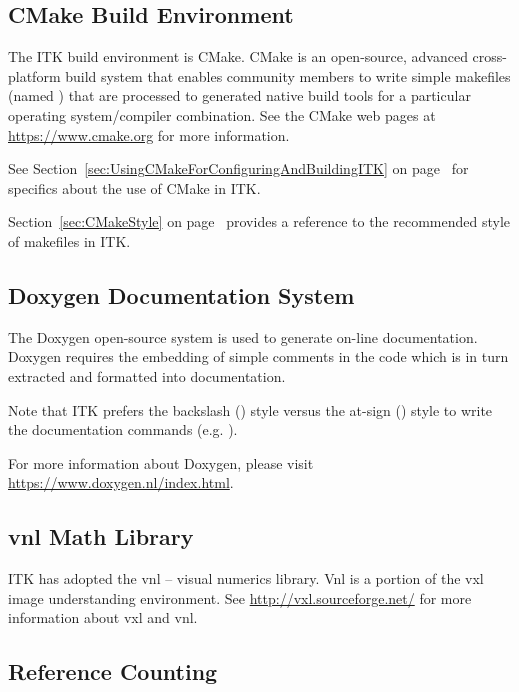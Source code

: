 \subsection{CMake Build Environment}%
\label{subsec:CMakeBuildEnvironment}

The ITK build environment is CMake. CMake is an open-source, advanced
cross-platform build system that enables community members to write simple
makefiles (named ) that are processed to generated native
build tools for a particular operating system/compiler combination. See the
CMake web pages at \href{https://www.cmake.org}{https://www.cmake.org} for more
information.

See Section~\ref{sec:UsingCMakeForConfiguringAndBuildingITK}
on page~\pageref{sec:UsingCMakeForConfiguringAndBuildingITK} for specifics about the use
of CMake in ITK.

Section~\ref{sec:CMakeStyle} on page~\pageref{sec:CMakeStyle} provides a
reference to the recommended style of makefiles in ITK.

\subsection{Doxygen Documentation System}%
\label{subsec:DoxygenDocumentationSystem}

The Doxygen open-source system is used to generate on-line documentation.
Doxygen requires the embedding of simple comments in the code which is in turn
extracted and formatted into documentation.

Note that ITK prefers the backslash (\code{\textbackslash}) style versus the
at-sign () style to write the documentation commands (e.g.
).

For more information about Doxygen, please visit
\href{https://www.doxygen.nl/index.html}{https://www.doxygen.nl/index.html}.

\subsection{vnl Math Library}%
\label{subsec:vnlMathLibrary}

ITK has adopted the vnl -- visual numerics library. Vnl is a portion of the vxl image
understanding environment. See \href{http://vxl.sourceforge.net/}{http://vxl.sourceforge.net/}
for more information about vxl and vnl.


\subsection{Reference Counting}%
\label{subsec:ReferenceCounting}

